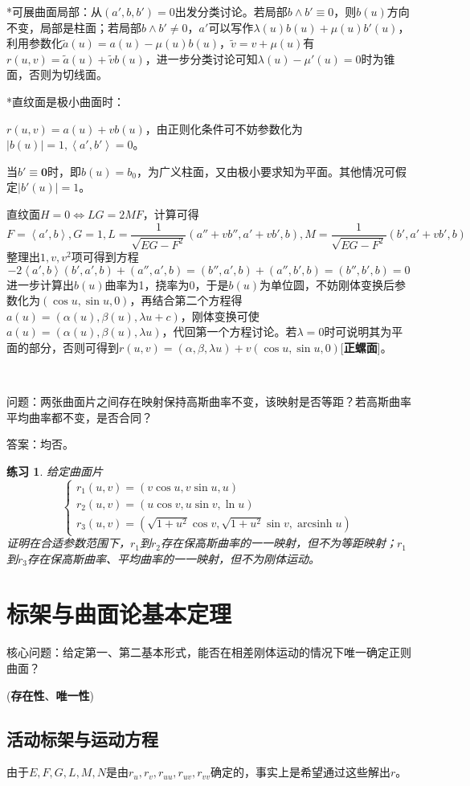 \documentclass[a4paper,UTF8,fontset=windows]{ctexart}
\DeclareMathOperator{\arcsinh}{arcsinh}
\newtheorem*{hw}{练习}
\begin{document}
*可展曲面局部：从$(a',b,b')=0$出发分类讨论。若局部$b\wedge b'\equiv0$，则$b(u)$方向不变，局部是柱面；若局部$b\wedge b'\ne0$，$a'$可以写作$\lambda(u)b(u)+\mu(u)b'(u)$，利用参数化$\tilde{a}(u)=a(u)-\mu(u)b(u)$，$\tilde{v}=v+\mu(u)$有$r(u,v)=\tilde{a}(u)+\tilde{v}b(u)$，进一步分类讨论可知$\lambda(u)-\mu'(u)=0$时为锥面，否则为切线面。

*直纹面是极小曲面时：

$r(u,v)=a(u)+vb(u)$，由正则化条件可不妨参数化为$|b(u)|=1,\left<a',b'\right>=0$。

当$b'\equiv\textbf{0}$时，即$b(u)=b_0$，为广义柱面，又由极小要求知为平面。其他情况可假定$|b'(u)|=1$。

直纹面$H=0\Leftrightarrow LG=2MF$，计算可得
$$F=\left<a',b\right>,G=1,L=\dfrac{1}{\sqrt{EG-F^2}}(a''+vb'',a'+vb',b),M=\dfrac{1}{\sqrt{EG-F^2}}(b',a'+vb',b)$$
整理出$1,v,v^2$项可得到方程
$$-2\left<a',b\right>(b',a',b)+(a'',a',b)=(b'',a',b)+(a'',b',b)=(b'',b',b)=0$$
进一步计算出$b(u)$曲率为1，挠率为0，于是$b(u)$为单位圆，不妨刚体变换后参数化为$(\cos u,\sin u,0)$，再结合第二个方程得$a(u)=(\alpha(u),\beta(u),\lambda u+c)$，刚体变换可使$a(u)=(\alpha(u),\beta(u),\lambda u)$，代回第一个方程讨论。若$\lambda=0$时可说明其为平面的部分，否则可得到$r(u,v)=(\alpha,\beta,\lambda u)+v(\cos u,\sin u, 0)$[\textbf{正螺面}]。

\


问题：两张曲面片之间存在映射保持高斯曲率不变，该映射是否等距？若高斯曲率平均曲率都不变，是否合同？

答案：均否。

\begin{hw}
给定曲面片$$\begin{cases}r_1(u,v)=(v\cos u,v\sin u,u)\\r_2(u,v)=(u\cos v,u\sin v,\ln u)\\r_3(u,v)=(\sqrt{1+u^2}\cos v,\sqrt{1+u^2}\sin v,\arcsinh u)\end{cases}$$
证明在合适参数范围下，$r_1$到$r_2$存在保高斯曲率的一一映射，但不为等距映射；$r_1$到$r_3$存在保高斯曲率、平均曲率的一一映射，但不为刚体运动。
\end{hw}

\section{标架与曲面论基本定理}
核心问题：给定第一、第二基本形式，能否在相差刚体运动的情况下唯一确定正则曲面？

(\textbf{存在性}、\textbf{唯一性})

\subsection{活动标架与运动方程}
由于$E,F,G,L,M,N$是由$r_u,r_v,r_{uu},r_{uv},r_{vv}$确定的，事实上是希望通过这些解出$r$。
\end{document}

